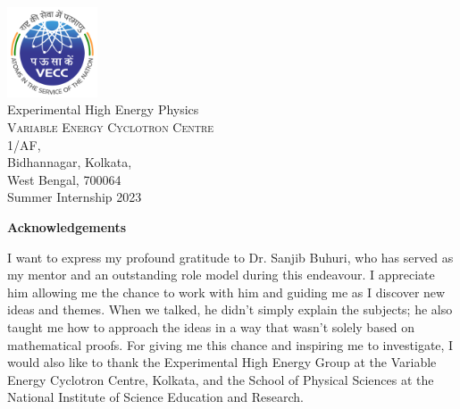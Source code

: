 \documentclass{article}
\begin{document}
\begin{titlepage}
\begin{center}
    \includegraphics[width=0.2\textwidth]{VECC.png}\\[0.1in]
    \Large{Experimental High Energy Physics}\\
    \normalsize
    \textsc{Variable Energy Cyclotron Centre}\\
    1/AF, \\Bidhannagar, Kolkata, \\West Bengal, 700064 \\
    \vspace{0.2in}
    Summer Internship 2023
    
    \end{center}
    
\end{titlepage}
\restoregeometry









\cleardoublepage
\begin{center}
    \Large{\textbf{Acknowledgements}}
\end{center}

\vspace{0.2in}
I want to express my profound gratitude to Dr. Sanjib Buhuri, 
who has served as my mentor and an outstanding role model during 
this endeavour. I appreciate him allowing me the chance to 
work with him and guiding me as I discover new ideas and themes. 
When we talked, he didn't simply explain the subjects; he also 
taught me how to approach the ideas in a way that wasn't solely 
based on mathematical proofs. For giving me this chance and inspiring 
me to investigate, I would also like to thank the Experimental High Energy Group
at the Variable Energy Cyclotron Centre, Kolkata, and the School 
of Physical Sciences at the National Institute of Science 
Education and Research.
\newpage
\restoregeometry
\end{document}
